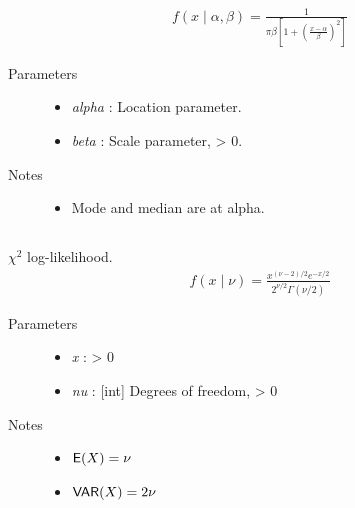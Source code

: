 \documentclass[]{jss}
\begin{document}
\begin{eqnarray*}
f(x \mid \alpha, \beta) = \frac{1}{\pi \beta [1 + (\frac{x-\alpha}{\beta})^2]}    
\end{eqnarray*}

\begin{description}
\item[Parameters] \leavevmode\begin{itemize}
\item {} 
\emph{alpha} : Location parameter.

\item {} 
\emph{beta} : Scale parameter, \textgreater{} 0.

\end{itemize}

\item[Notes]\leavevmode\begin{itemize}
\item {} 
Mode and median are at alpha.

\end{itemize}

\end{description}

\subsection[chi2]{ }

$\chi^2$ log-likelihood.
\begin{eqnarray*}
    f(x \mid \nu) = \frac{x^{(\nu-2)/2}e^{-x/2}}{2^{\nu/2}\Gamma(\nu/2)}
\end{eqnarray*}

\begin{description}
\item[Parameters] \leavevmode\begin{itemize}
\item {} 
\emph{x} : \textgreater{} 0

\item {} 
\emph{nu} : {[}int{]} Degrees of freedom, \textgreater{} 0

\end{itemize}

\item[Notes]\leavevmode\begin{itemize}
\item {} 
$\mathsf{E}(X)=\nu$

\item {} 
$\mathsf{VAR}(X)=2\nu$

\end{itemize}


\end{description}
\end{document}
